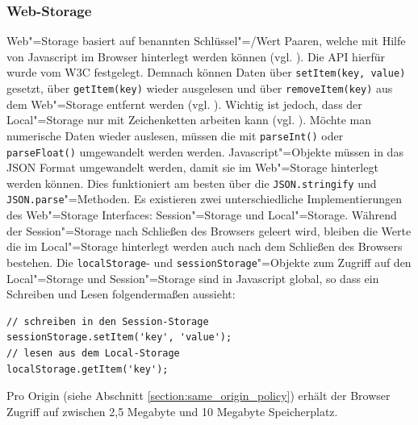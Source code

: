 \subsubsection*{Web-Storage}
Web"=Storage basiert auf benannten Schlüssel"=/Wert Paaren, welche mit Hilfe von Javascript im Browser hinterlegt werden können (vgl. \cite{html5upandrunningchapter7}). Die API hierfür wurde vom W3C festgelegt. Demnach können Daten über \texttt{setItem(key, value)} gesetzt, über \texttt{getItem(key)} wieder ausgelesen und über \texttt{removeItem(key)} aus dem Web"=Storage entfernt werden (vgl. \cite{W3C2011}). Wichtig ist jedoch, dass der Local"=Storage nur mit Zeichenketten arbeiten kann (vgl. \cite{W3C2011}). Möchte man numerische Daten wieder auslesen, müssen die mit \texttt{parseInt()} oder \texttt{parseFloat()} umgewandelt werden werden. Javascript"=Objekte müssen in das JSON Format umgewandelt werden, damit sie im Web"=Storage hinterlegt werden können. Dies funktioniert am besten über die \texttt{JSON.stringify} und \texttt{JSON.parse}"=Methoden. Es existieren zwei unterschiedliche Implementierungen des Web"=Storage Interfaces: Session"=Storage und Local"=Storage. Während der Session"=Storage nach Schließen des Browsers geleert wird, bleiben die Werte die im Local"=Storage hinterlegt werden auch nach dem Schließen des Browsers bestehen. Die \texttt{localStorage}- und \texttt{sessionStorage}"=Objekte zum Zugriff auf den Local"=Storage und Session"=Storage sind in Javascript global, so dass ein Schreiben und Lesen folgendermaßen aussieht:
\begin{lstlisting}
// schreiben in den Session-Storage
sessionStorage.setItem('key', 'value');
// lesen aus dem Local-Storage
localStorage.getItem('key');
\end{lstlisting}
Pro Origin (siehe Abschnitt \ref{section:same_origin_policy}) erhält der Browser Zugriff auf zwischen 2,5 Megabyte und 10 Megabyte Speicherplatz.

